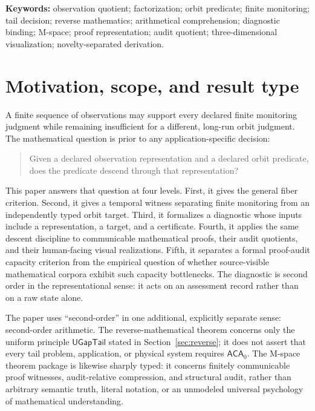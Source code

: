 \documentclass[11pt]{article}
\newcommand{\RCA}{\ensuremath{\mathsf{RCA}_0}}
\newcommand{\ACA}{\ensuremath{\mathsf{ACA}_0}}
\newcommand{\UGapTail}{\ensuremath{\mathsf{UGapTail}}}
\theoremstyle{plain}
\theoremstyle{definition}
\theoremstyle{remark}
\begin{document}
\begin{abstract}
Separately, we formulate the uniform gap-tail principle $\UGapTail$ and prove,
over $\RCA$, that $\UGapTail\leftrightarrow\ACA$.  The quotient, temporal,
binding, proof-architecture, and reverse-mathematical results are distinct
formal claims.  Application and physical interpretations remain bridge-required.
\end{abstract}

\noindent\textbf{Keywords:} observation quotient; factorization; orbit predicate;
finite monitoring; tail decision; reverse mathematics; arithmetical
comprehension; diagnostic binding; M-space; proof representation; audit quotient;
three-dimensional visualization; novelty-separated derivation.

\section{Motivation, scope, and result type}
\label{sec:intro}

A finite sequence of observations may support every declared finite monitoring
judgment while remaining insufficient for a different, long-run orbit judgment.
The mathematical question is prior to any application-specific decision:
\begin{quote}
Given a declared observation representation and a declared orbit predicate, does
the predicate descend through that representation?
\end{quote}

This paper answers that question at four levels.  First, it gives the general
fiber criterion.  Second, it gives a temporal witness separating finite
monitoring from an independently typed orbit target.  Third, it formalizes a
diagnostic whose inputs include a representation, a target, and a certificate.
Fourth, it applies the same descent discipline to communicable mathematical
proofs, their audit quotients, and their human-facing visual realizations.
Fifth, it separates a formal proof-audit capacity criterion from the empirical
question of whether source-visible mathematical corpora exhibit such capacity
bottlenecks.  The diagnostic is second order in the representational sense: it
acts on an assessment record rather than on a raw state alone.

The paper uses ``second-order'' in one additional, explicitly separate sense:
second-order arithmetic.  The reverse-mathematical theorem concerns only the
uniform principle $\UGapTail$ stated in Section~\ref{sec:reverse}; it does not
assert that every tail problem, application, or physical system requires
$\ACA$.  The M-space theorem package is likewise sharply typed: it concerns
finitely communicable proof witnesses, audit-relative compression, and
structural audit, rather than arbitrary semantic truth, literal notation, or an
unmodeled universal psychology of mathematical understanding.
\end{document}
